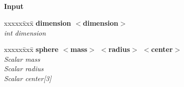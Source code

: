 \documentclass[11pt]{article}
\begin{document}
% 
% 
% 

\begin{center}
\end{center}


\subsection{}

\textbf{Input}

\begin{tabbing}
xxxxx\=xxx\=\kill
\> \done \textbf{dimension $<$dimension$>$} \\
\> \> \textit{int dimension}
\end{tabbing}
\begin{tabbing}
xxxxx\=xxx\=\kill
\> \done \textbf{sphere $<$mass$>$ $<$radius$>$ $<$center$>$} \\
\>\> \textit{Scalar mass} \\
\>\> \textit{Scalar radius} \\
\>\> \textit{Scalar center[3]}
\end{tabbing}
\end{document}
